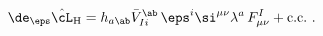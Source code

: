 \begin{equation}
  \de_\eps \hat{\cL}_\mathrm{H} = h_{a\ab} \bar{V}_{Ii}^\ab\, \eps^i
  \si^{\mu\nu} \lambda^a\, F_{\mu\nu}^I + \text{c.c.}\ .
 \end{equation}

